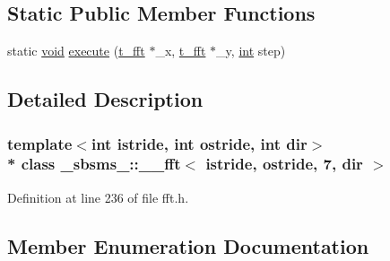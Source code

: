 \subsection*{Static Public Member Functions}
\begin{DoxyCompactItemize}
\item 
static \hyperlink{sound_8c_ae35f5844602719cf66324f4de2a658b3}{void} \hyperlink{class__sbsms___1_1____fft_3_01istride_00_01ostride_00_017_00_01dir_01_4_a4d4866bfd2179ab4308d78aa1972682c}{execute} (\hyperlink{namespace__sbsms___af5c6f976b2da21c36853e3b0c5995a54}{t\+\_\+fft} $\ast$\+\_\+x, \hyperlink{namespace__sbsms___af5c6f976b2da21c36853e3b0c5995a54}{t\+\_\+fft} $\ast$\+\_\+y, \hyperlink{xmltok_8h_a5a0d4a5641ce434f1d23533f2b2e6653}{int} step)
\end{DoxyCompactItemize}


\subsection{Detailed Description}
\subsubsection*{template$<$int istride, int ostride, int dir$>$\\*
class \+\_\+sbsms\+\_\+\+::\+\_\+\+\_\+fft$<$ istride, ostride, 7, dir $>$}



Definition at line 236 of file fft.\+h.



\subsection{Member Enumeration Documentation}
